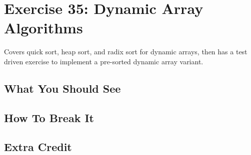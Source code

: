 \chapter{Exercise 35: Dynamic Array Algorithms}

Covers quick sort, heap sort, and radix sort for dynamic arrays, then has a test driven exercise to implement
a pre-sorted dynamic array variant.

\section{What You Should See}


\section{How To Break It}


\section{Extra Credit}



